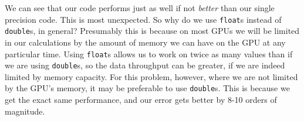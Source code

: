 \documentclass[a4paper, fleqn]{article}
\begin{document}
We can see that our code performs just as well if not \emph{better} than our single precision code. This is most unexpected. So why do we use \texttt{float}s instead of \texttt{double}s, in general? Presumably this is because on most GPUs we will be limited in our calculations by the amount of memory we can have on the GPU at any particular time. Using \texttt{float}s allows us to work on twice as many values than if we are using \texttt{double}s, so the data throughput can be greater, if we are indeed limited by memory capacity. For this problem, however, where we are not limited by the GPU's memory, it may be preferable to use \texttt{double}s. This is because we get the exact same performance, and our error gets better by 8-10 orders of magnitude.
\end{document}
